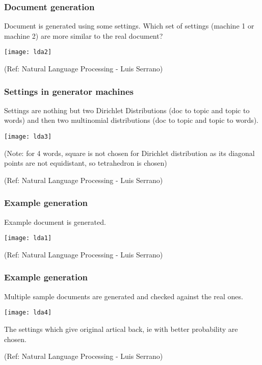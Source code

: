 \begin{frame}[fragile]\frametitle{Document generation}

Document is generated using some settings. Which set of settings (machine 1 or machine 2) are more similar to the real document?

\begin{center}
\texttt{[image: lda2]}
\end{center}

{\tiny (Ref: Natural Language Processing - Luis Serrano)}
\end{frame}


\begin{frame}[fragile]\frametitle{Settings in generator machines}

Settings are nothing but two Dirichlet Distributions (doc to topic and topic to words) and then two multinomial distributions (doc to topic and topic to words).

\begin{center}
\texttt{[image: lda3]}
\end{center}

(Note: for 4 words, square is not chosen for Dirichlet distribution as its diagonal points are not equidistant, so tetrahedron is chosen)


{\tiny (Ref: Natural Language Processing - Luis Serrano)}
\end{frame}

\begin{frame}[fragile]\frametitle{Example generation}

Example document is generated.

\begin{center}
\texttt{[image: lda1]}
\end{center}

{\tiny (Ref: Natural Language Processing - Luis Serrano)}
\end{frame}

\begin{frame}[fragile]\frametitle{Example generation}

Multiple sample documents are generated and checked against the real ones.

\begin{center}
\texttt{[image: lda4]}
\end{center}

The settings which give original artical back, ie with better probability are chosen.

{\tiny (Ref: Natural Language Processing - Luis Serrano)}
\end{frame}




